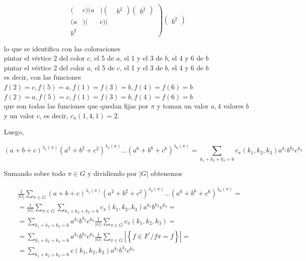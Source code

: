 \documentclass[10pt]{article}
\begin{document}
$$
\left.\begin{array}{lll}
( & c)(a & )\left(\begin{array}{ll} 
& b^{2}
\end{array}\right)\left(\begin{array}{l}
b^{2}
\end{array}\right) \\
(a & )( & c)( \\
b^{2}
\end{array}\right)\left(\begin{array}{l}
b^{2}
\end{array}\right)
$$

lo que se identifica con las coloraciones\\
pintar el vértice 2 del color $c$, el 5 de $a$, el 1 y el 3 de $b$, el 4 y 6 de $b$\\
pintar el vértice 2 del color $a$, el 5 de $c$, el 1 y el 3 de $b$, el 4 y 6 de $b$\\
es decir, con las funciones\\
$f(2)=c, f(5)=a, f(1)=f(3)=b, f(4)=f(6)=b$\\
$f(2)=a, f(5)=c, f(1)=f(3)=b, f(4)=f(6)=b$\\
que son todas las funciones que quedan fijas por $\pi$ y toman un valor $a, 4$ valores $b$ y un valor $c$, es decir, $c_{\pi}(1,4,1)=2$.

Luego,

$$
(a+b+c)^{\lambda_{1}(\pi)}\left(a^{2}+b^{2}+c^{2}\right)^{\lambda_{2}(\pi)} \ldots\left(a^{6}+b^{6}+c^{6}\right)^{\lambda_{6}(\pi)}=\sum_{k_{1}+k_{2}+k_{3}=6} c_{\pi}\left(k_{1}, k_{2}, k_{3}\right) a^{k_{1}} b^{k_{2}} c^{k_{3}}
$$

Sumando sobre todo $\pi \in G$ y dividiendo por $|G|$ obtenemos

$$
\begin{aligned}
& \frac{1}{|G|} \sum_{\pi \in G}(a+b+c)^{\lambda_{1}(\pi)}\left(a^{2}+b^{2}+c^{2}\right)^{\lambda_{2}(\pi)} \ldots\left(a^{6}+b^{6}+c^{6}\right)^{\lambda_{6}(\pi)}= \\
& =\frac{1}{|G|} \sum_{\pi \in G} \sum_{k_{1}+k_{2}+k_{3}=6} c_{\pi}\left(k_{1}, k_{2}, k_{3}\right) a^{k_{1}} b^{k_{2}} c^{k_{3}}= \\
& =\sum_{k_{1}+k_{2}+k_{3}=6} a^{k_{1}} b^{k_{2}} c^{k_{3}} \frac{1}{|G|} \sum_{\pi \in G} c_{\pi}\left(k_{1}, k_{2}, k_{3}\right)= \\
& =\sum_{k_{1}+k_{2}+k_{3}=6} a^{k_{1}} b^{k_{2}} c^{k_{3}} \frac{1}{|G|} \sum_{\pi \in G}\left|\left\{f \in F^{\prime} / f \pi=f\right\}\right|= \\
& =\sum_{k_{1}+k_{2}+k_{3}=6} c\left(k_{1}, k_{2}, k_{3}\right) a^{k_{1}} b^{k_{2}} c^{k_{3}}
\end{aligned}
$$
\end{document}
